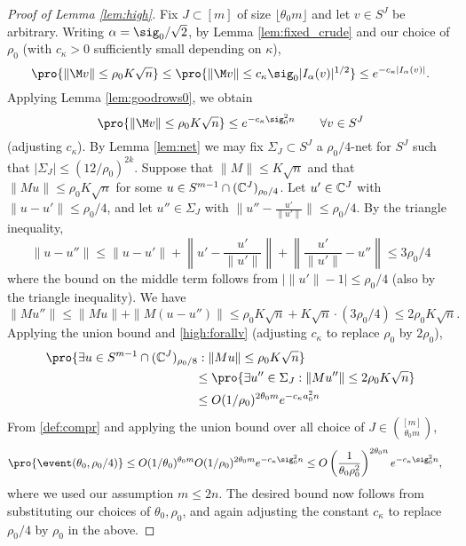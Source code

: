 \documentclass[aop,preprint]{imsart}
\theoremstyle{plain}
\theoremstyle{definition}
\theoremstyle{remark}
\numberwithin{equation}{section}
\numberwithin{theorem}{section}
\def \lf {\lfloor}
\def \rf {\rfloor}
\begin{document}
\begin{proof}[Proof of Lemma \ref{lem:high}]
Fix $J\subset [m]$ of size $\lf \theta_0m\rf$ and let $v\in S^J$ be arbitrary. 
Writing $\alpha=\sig_0/\sqrt{2}$, by Lemma \ref{lem:fixed_crude} and our choice of $\rho_0$ (with $c_\kappa>0$ sufficiently small depending on $\kappa$),
\[
\pro{ \|\M v\|\le \rho_0K \sqrt{n}} \le \pro{ \|\M v\|\le c_\kappa\sig_0|I_{\alpha}(v)|^{1/2}}
\le e^{-c_\kappa|I_{\alpha}(v)|}.
\]
Applying Lemma \ref{lem:goodrows0}, we obtain
\begin{equation}	\label{high:forallv}
\pro{ \|\M v\|\le \rho_0K\sqrt{n}} \le e^{-c_\kappa\sig_0^2 n}\qquad \forall v\in S^J
\end{equation}
(adjusting $c_\kappa$). 
By Lemma \ref{lem:net} we may fix $\Sigma_J\subset S^J$ a $\rho_0/4$-net for $S^J$ such that $|\Sigma_J|\le (12/\rho_0)^{2k}$.
Suppose that $\|M\|\le K\sqrt{n}$ and that $\|Mu\|\le \rho_0 K\sqrt{n}$ for some $u\in S^{m-1}\cap ({\mathbb C}^J)_{\rho_0/4}$.
Let $u'\in {\mathbb C}^J$ with $\|u-u'\|\le \rho_0/4$, and let $u''\in \Sigma_J$ with $\|u''-\frac{u'}{\|u'\|}\|\le \rho_0/4$. 
By the triangle inequality,
\[
\| u-u''\| \le \|u-u'\| + \left\| u'-\frac{u'}{\|u'\|}\right\| + \left\| \frac{u'}{\|u'\|} - u''\right\| \le 3\rho_0/4
\]
where the bound on the middle term follows from $|\|u'\|-1|\le \rho_0/4$ (also by the triangle inequality).
We have
\[
\|Mu''\|\le \|Mu\| + \|M(u-u'')\| \le \rho_0K\sqrt{n} + K\sqrt{n}\cdot (3\rho_0/4) \le 2\rho_0 K\sqrt{n}.
\]
Applying the union bound and \eqref{high:forallv} (adjusting $c_\kappa$ to replace $\rho_0$ by $2\rho_0$),
\begin{align*}
&\pro{ \exists u\in S^{m-1}\cap (\C^J)_{\rho_0/8}: \|Mu\|\le \rho_0K\sqrt{n}} \\
&\qquad\qquad\qquad\qquad\qquad\qquad\le \pro{ \exists u''\in \Sigma_J: \|Mu''\|\le 2\rho_0K\sqrt{n}}\\
&\qquad\qquad\qquad\qquad\qquad\qquad\le O(1/\rho_0)^{2\theta_0 m} e^{-c_\kappa a_0^2n}
\end{align*}
From \eqref{def:compr} and applying the union bound over all choice of $J\in {[m]\choose  \theta_0 m}$, 
\begin{align*}
\pro{ \event(\theta_0,\rho_0/4)} &\le O(1/\theta_0)^{\theta_0m} O(1/\rho_0)^{2\theta_0m} e^{-c_\kappa\sig_0^2n}\le O\left(\frac{1}{\theta_0\rho_0^2}\right)^{2\theta_0 n} e^{-c_\kappa\sig_0^2n},
\end{align*}
where we used our assumption $m\le 2n$.
The desired bound now follows from substituting our choices of $\theta_0,\rho_0$, and again adjusting the constant $c_\kappa$ to replace $\rho_0/4$ by $\rho_0$ in the above.
\end{proof}
\end{document}
